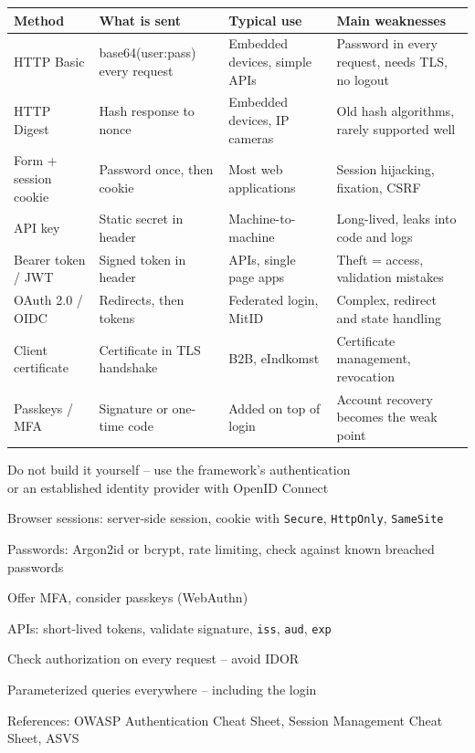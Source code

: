 \documentclass[Screen16to9,17pt]{foils}
\begin{document}
{\small
\begin{tabular}{p{4cm}p{5cm}p{4.2cm}p{7.2cm}}
\textbf{Method} & \textbf{What is sent} & \textbf{Typical use} & \textbf{Main weaknesses}\\\hline
HTTP Basic & base64(user:pass) every request & Embedded devices, simple APIs & Password in every request, needs TLS, no logout\\
HTTP Digest & Hash response to nonce & Embedded devices, IP cameras & Old hash algorithms, rarely supported well\\
Form + session cookie & Password once, then cookie & Most web applications & Session hijacking, fixation, CSRF\\
API key & Static secret in header & Machine-to-machine & Long-lived, leaks into code and logs\\
Bearer token / JWT & Signed token in header & APIs, single page apps & Theft = access, validation mistakes\\
OAuth 2.0 / OIDC & Redirects, then tokens & Federated login, MitID & Complex, redirect and state handling\\
Client certificate & Certificate in TLS handshake & B2B, eIndkomst & Certificate management, revocation\\
Passkeys / MFA & Signature or one-time code & Added on top of login & Account recovery becomes the weak point\\
\end{tabular}
}


\begin{list2}
\item Do not build it yourself -- use the framework's authentication\\
  or an established identity provider with OpenID Connect
\item Browser sessions: server-side session, cookie with \verb+Secure+, \verb+HttpOnly+, \verb+SameSite+
\item Passwords: Argon2id or bcrypt, rate limiting, check against known breached passwords
\item Offer MFA, consider passkeys (WebAuthn)
\item APIs: short-lived tokens, validate signature, \verb+iss+, \verb+aud+, \verb+exp+
\item Check authorization on every request -- avoid IDOR
\item Parameterized queries everywhere -- including the login
\item References: OWASP Authentication Cheat Sheet, Session Management Cheat Sheet, ASVS\\
\end{list2}
\end{document}
